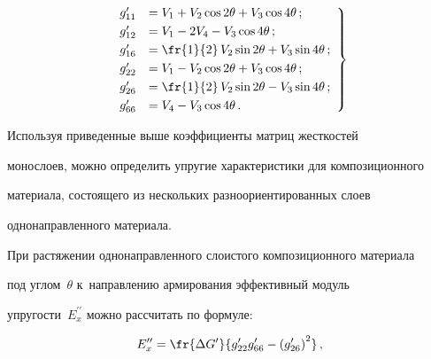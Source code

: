 \begin{equation}


\left.


\begin{array}{rl}


g_{11}^\prime &= V_1+V_2\cos 2\theta +V_3\cos 4\theta\,;\\[3pt]


g_{12}^\prime &=V_1-2V_4 -V_3\cos 4\theta\,;\\[3pt]


g_{16}^\prime &= \fr{1}{2}\,V_2\sin 2\theta +V_3 \sin 4\theta\,;\\[3pt]


g_{22}^\prime &= V_1-V_2\cos 2\theta +V_3 \cos 4\theta\,;\\[3pt]


g_{26}^\prime &= \fr{1}{2}\,V_2\sin 2\theta -V_3 \sin 4\theta\,;\\[3pt]


g_{66}^\prime &= V_4-V_3 \cos 4\theta\,.


\end{array}


\right\}


\label{e2-ab}


\end{equation}





     \vspace*{-3pt}


     


     Используя приведенные выше коэффициенты матриц жесткостей 


монослоев, можно определить упругие характеристики для композиционного 


материала, состоящего из нескольких разноориентированных слоев 


однонаправленного материала.


     


     При растяжении однонаправленного слоистого композиционного материала 


под углом~$\theta$ к~направлению армирования эффективный модуль  


упру\-гости~$E_x^{\prime\prime}$ можно рассчитать по формуле:


     \begin{equation}


     E_x^{\prime\prime} =\fr{\Delta G^\prime}{g_{22}^\prime g_{66}^\prime - \left( 


g^\prime_{26}\right)^2}\,,


     \label{e3-ab}


     \end{equation}


